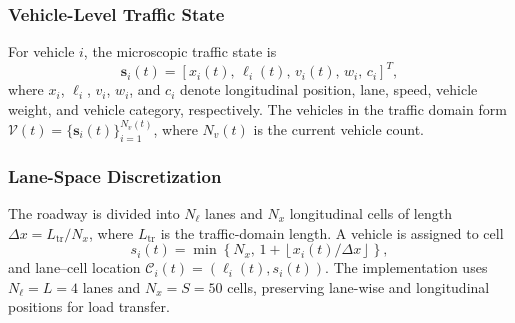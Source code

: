 \documentclass[journal]{IEEEtran}
\begin{document}
\subsubsection{Vehicle-Level Traffic State}
\label{subsec:vehicle_state}
For vehicle $i$, the microscopic traffic state is
\begin{equation}
\mathbf{s}_i(t)=
[x_i(t),\,\ell_i(t),\,v_i(t),\,w_i,\,c_i]^{T},
\label{eq:vehicle_state}
\end{equation}
where $x_i$, $\ell_i$, $v_i$, $w_i$, and $c_i$ denote longitudinal position, lane, speed, vehicle weight, and vehicle category, respectively. The vehicles in the traffic domain form
$\mathcal{V}(t)=\{\mathbf{s}_i(t)\}_{i=1}^{N_v(t)}$, where $N_v(t)$ is the current vehicle count.

\subsubsection{Lane-Space Discretization}
\label{subsec:lane_space}
The roadway is divided into $N_\ell$ lanes and $N_x$ longitudinal cells of length $\Delta x=L_{\mathrm{tr}}/N_x$, where $L_{\mathrm{tr}}$ is the traffic-domain length. A vehicle is assigned to cell
\begin{equation}
s_i(t)=\min\!\left\{N_x,\,
1+\left\lfloor x_i(t)/\Delta x\right\rfloor\right\},
\label{eq:cell_index}
\end{equation}
and lane--cell location $\mathcal{C}_i(t)=(\ell_i(t),s_i(t))$. The implementation uses $N_\ell=L=4$ lanes and $N_x=S=50$ cells, preserving lane-wise and longitudinal positions for load transfer.
\end{document}
